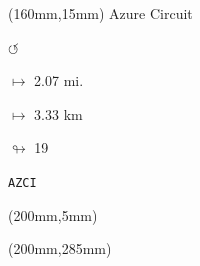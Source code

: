 \begin{textblock*}{40mm}(160mm,15mm)%
Azure Circuit
\par \Huge$\circlearrowleft$
\Large
\par$\mapsto$ 2.07 mi.
\par$\mapsto$ 3.33 km
\par$\looparrowright$ 19
\par\hfill\tiny\tt AZCI\\
\end{textblock*}
\begin{textblock*}{20mm}(200mm,5mm)%
\fbox{\thepage}
\end{textblock*}
\begin{textblock*}{20mm}(200mm,285mm)%
\fbox{\thepage}
\end{textblock*}
\null\newpage

